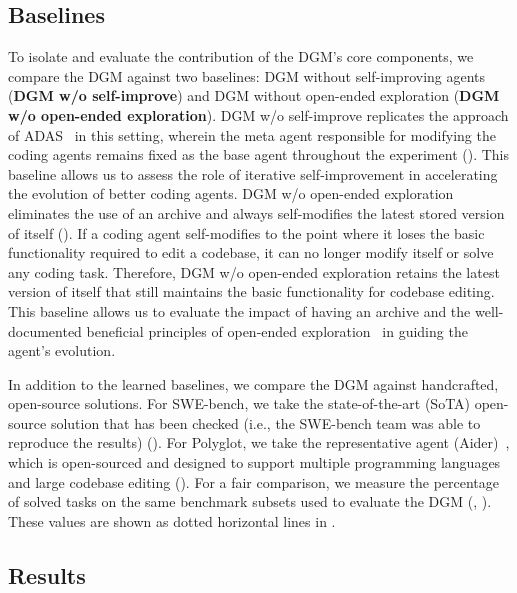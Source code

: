 \documentclass{article}
\begin{document}
\subsection{Baselines}
\label{sec:baselines}


To isolate and evaluate the contribution of the DGM's core components, we compare the DGM against two baselines: DGM without self-improving agents (\textbf{DGM w/o self-improve}) and DGM without open-ended exploration (\textbf{DGM w/o open-ended exploration}). DGM w/o self-improve replicates the approach of ADAS~\citep{hu2025automated} in this setting, wherein the meta agent responsible for modifying the coding agents remains fixed as the base agent throughout the experiment (). This baseline allows us to assess the role of iterative self-improvement in accelerating the evolution of better coding agents. DGM w/o open-ended exploration eliminates the use of an archive and always self-modifies the latest stored version of itself (). If a coding agent self-modifies to the point where it loses the basic functionality required to edit a codebase, it can no longer modify itself or solve any coding task. Therefore, DGM w/o open-ended exploration retains the latest version of itself that still maintains the basic functionality for codebase editing. This baseline allows us to evaluate the impact of having an archive and the well-documented beneficial principles of open-ended exploration~\citep{clune2019ai, stanley2015greatness, zhang2024omni, fernandopromptbreeder, lee2020learning, samvelyan2024rainbow, colas2022autotelic} in guiding the agent's evolution.

In addition to the learned baselines, we compare the DGM against handcrafted, open-source solutions. For SWE-bench, we take the state-of-the-art (SoTA) open-source solution that has been checked (i.e., the SWE-bench team was able to reproduce the results) (). For Polyglot, we take the representative agent (Aider)~\citep{aider2024}, which is open-sourced and designed to support multiple programming languages and large codebase editing (). For a fair comparison, we measure the percentage of solved tasks on the same benchmark subsets used to evaluate the DGM (, ). These values are shown as dotted horizontal lines in .


\subsection{Results}
\label{sec:results}
\end{document}
